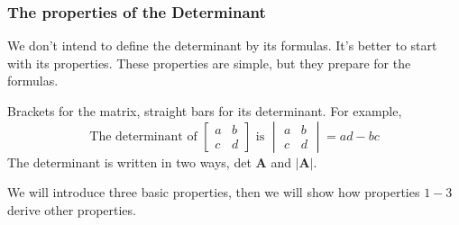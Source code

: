 \subsubsection{The properties of the Determinant}
We don't intend to define the determinant by its formulas. It's better to start with its properties. These properties are simple, but they prepare for the formulas.
\begin{remark}
Brackets for the matrix, straight bars for its determinant. For example,
\[
\text{The determinant of }\begin{bmatrix}
a&b\\c&d
\end{bmatrix} \text{ is } \begin{vmatrix}
a&b\\c&d\end{vmatrix}=ad-bc
\]
The determinant is written in two ways, det $\bm A$ and $|\bm A|$.
\end{remark}
We will introduce three basic properties, then we will show how properties $1-3$ derive other properties.\\

